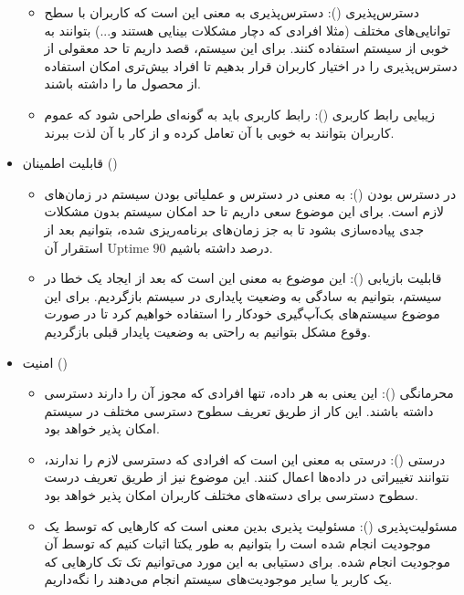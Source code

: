\begin{itemize}
\begin{itemize}
\item 
دسترس‌پذیری (): دسترس‌‌پذیری به معنی این است که کاربران با سطح توانایی‌های مختلف (مثلا افرادی که دچار مشکلات بینایی هستند و...) بتوانند به خوبی از سیستم استفاده کنند. برای این سیستم،‌ قصد داریم تا حد معقولی از دسترس‌پذیری را در اختیار کاربران قرار بدهیم تا افراد بیش‌تری امکان استفاده از محصول ما را داشته باشند. 


\item 
زیبایی رابط کاربری (): رابط کاربری باید به گونه‌ای طراحی شود که عموم کاربران بتوانند به خوبی با آن تعامل کرده و از کار با آن لذت ببرند. 


\end{itemize}


\item
قابلیت اطمینان ()

\begin{itemize}
	\item 
	
	در دسترس بودن (): به معنی در دسترس و عملیاتی بودن سیستم در زمان‌های لازم است. برای این موضوع سعی داریم تا حد امکان سیستم بدون مشکلات جدی پیاده‌سازی بشود تا به جز زمان‌های برنامه‌ریزی شده، بتوانیم بعد از استقرار آن Uptime $90$ درصد داشته باشیم.
	
	\item
	قابلیت بازیابی (): این موضوع به معنی این است که بعد از ایجاد یک خطا در سیستم، بتوانیم به سادگی به وضعیت پایداری در سیستم بازگردیم. برای این موضوع سیستم‌های بک‌آپ‌گیری خودکار را استفاده خواهیم کرد تا در صورت وقوع مشکل بتوانیم به راحتی به وضعیت پایدار قبلی بازگردیم.
\end{itemize}

\item
امنیت ()

\begin{itemize}
	\item 
	محرمانگی (): این یعنی به هر داده، تنها افرادی که مجوز آن را دارند دسترسی داشته باشند. این کار از طریق تعریف سطوح دسترسی مختلف در سیستم امکان پذیر خواهد بود.
	
	\item 
	درستی (): درستی به معنی این است که افرادی که دسترسی لازم را ندارند، نتوانند تغییراتی در داده‌ها اعمال کنند. این موضوع نیز از طریق تعریف درست سطوح دسترسی برای دسته‌های مختلف کاربران امکان پذیر خواهد بود.
	\item 
	مسئولیت‌پذیری (): مسئولیت پذیری بدین معنی است که کارهایی که توسط یک موجودیت انجام شده است را بتوانیم به طور یکتا اثبات کنیم که توسط آن موجودیت انجام شده. برای دستیابی به این مورد می‌توانیم  تک تک کارهایی که یک کاربر یا سایر موجودیت‌های سیستم انجام می‌دهند را نگه‌داریم.
\end{itemize}


\end{itemize}
